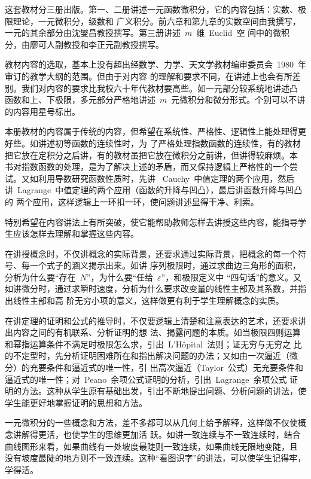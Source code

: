 
\begin{preface}
这套教材分三册出版。第一、二册讲述一元函数微积分，它的内容包括：实数、极限理论，一元微积分，级数和
广义积分。前六章和第九章的实数空间由我撰写，一元的其余部分由沈燮昌教授撰写。第三册讲述~$m$~维~Euclid~空
间中的微积分，由廖可人副教授和李正元副教授撰写。

教材内容的选取，基本上没有超出经数学、力学、天文学教材编审委员会~1980~年审订的教学大纲的范围。但由于对内容
的理解和要求不同，在讲述上也会有所差别。我们对内容的要求比我校六十年代教材要高些。如一元部分较系统地讲述凸
函数和上、下极限，多元部分严格地讲述~$m$~元微积分和微分形式。个别可以不讲的内容用星号标出。

本册教材的内容属于传统的内容，但希望在系统性、严格性、逻辑性上能处理得更好些。如讲述初等函数的连续性时，为
了严格处理指数函数的连续性，有的教材把它放在定积分之后讲，有的教材虽把它放在微积分之前讲，但讲得较麻烦。本
书对指数函数的处理，是为了解决上述的矛盾，而又保持逻辑上严格性的一个尝试。又如利用导数研究函数性质时，先讲
~Cauchy~中值定理的两个应用，然后讲~Lagrange~中值定理的两个应用（函数的升降与凹凸），最后讲函数升降与凹凸的
两个应用，这样逻辑上一环扣一环，使问题讲述显得干净、利索。

特别希望在内容讲法上有所突破，使它能帮助教师怎样去讲授这些内容，能指导学生应该怎样去理解和掌握这些内容。

在讲授概念时，不仅讲概念的实际背景，还要求通过实际背景，把概念的每一个符号、每一个式子的涵义揭示出来。如讲
序列极限时，通过求曲边三角形的面积，分析为什么要“存在~$N$”，为什么要“任给~$\varepsilon$”，和极限定义中
“四句话”的意义。又如讲微分时，通过求瞬时速度，分析为什么要求改变量的线性主部及其系数，并指出线性主部和高
阶无穷小项的意义，这样做更有利于学生理解概念的实质。

在讲定理的证明和公式的推导时，不仅要逻辑上清楚和注意表达的艺术，还要求讲出内容之间的有机联系、分析证明的想
法、揭露问题的本质。如当极限四则运算和幂指运算条件不满足时极限怎么求，引出~L'H\^opital~法则；证无穷与无穷之
比的不定型时，先分析证明困难所在和指出解决问题的办法；又如由一次逼近（微分）的充要条件和逼近式的唯一性，引
出高次逼近（Taylor~公式）无充要条件和逼近式的唯一性；对~Peano~余项公式证明的分析，引出~Lagrange~余项公式
证明的方法。这种从学生原有基础出发，引出不断地提出问题、分析问题的讲法，使学生能更好地掌握证明的思想和方法。

一元微积分的一些概念和方法，差不多都可以从几何上给予解释，这样做不仅使概念讲解得更活，也使学生的思维更加活
跃。如讲一致连续与不一致连续时，结合曲线图形来看，如果曲线有一处坡度最陡则一致连续，如果曲线无限地变陡，且
没有坡度最陡的地方则不一致连续。这种“看图识字”的讲法，可以使学生记得牢，学得活。


\end{preface}

